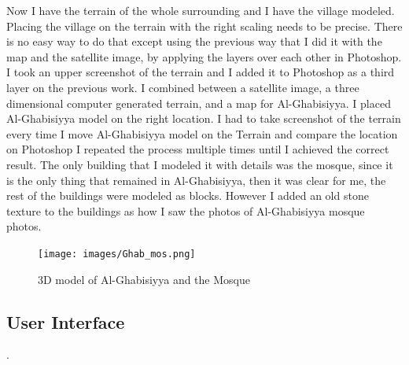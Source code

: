 Now I have the terrain of the whole surrounding and I have the village modeled. Placing the village on the terrain with the right scaling needs to be precise. There is no easy way to do that except using the previous way that I did it with the map and the satellite image, by applying the layers over each other in Photoshop. I took an upper screenshot of the terrain and I added it to Photoshop as a third layer on the previous work. I combined between a satellite image, a three dimensional computer generated terrain, and a map for Al-Ghabisiyya. I placed Al-Ghabisiyya model on the right location. I had to take screenshot of the terrain every time I move Al-Ghabisiyya model on the Terrain and compare the location on Photoshop I repeated the process multiple times until I achieved the correct result. The only building that I modeled it with details was the mosque, since it is the only thing that remained in Al-Ghabisiyya, then it was clear for me, the rest of the buildings were modeled as blocks. However I added an old stone texture to the buildings as how I saw the photos of Al-Ghabisiyya mosque photos. 

\begin{figure}[ht]
    \centering
    \texttt{[image: images/Ghab\_mos.png]}
    \caption{3D model of Al-Ghabisiyya and the Mosque}
    \label{fig:3d}
\end{figure} 

\subsection{User Interface}

 \citep{burdea2017virtual}.